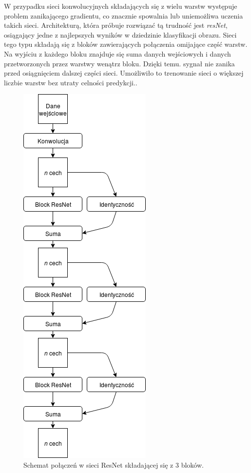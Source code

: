 \documentclass[a4paper,11pt,twoside]{report}
\theoremstyle{definition}
\begin{document}
W przypadku sieci konwolucyjnych składających się z wielu warstw występuje problem zanikającego gradientu, co znacznie spowalnia lub uniemożliwa uczenia takich sieci\cite{difficulty}.
Architekturą, która próbuje rozwiązać tą trudność jest \textit{resNet}, osiągający jedne z najlepszych wyników w dziedzinie klasyfikacji obrazu. Sieci tego typu składają się z bloków zawierających połączenia omijające część warstw. Na wyjściu z każdego bloku znajduje się suma danych wejściowych i danych przetworzonych przez warstwy wenątrz bloku. Dzięki temu. sygnał nie zanika przed osiągnięciem dalszej części sieci. Umożliwiło to trenowanie sieci o większej liczbie warstw bez utraty celności predykcji.\cite{resnet}.

\begin{figure}[h!]
	\centering
	\includegraphics[scale=0.7]{resnet}
	\caption{Schemat połączeń w sieci ResNet składającej się z 3 bloków.}
\end{figure}
\end{document}
